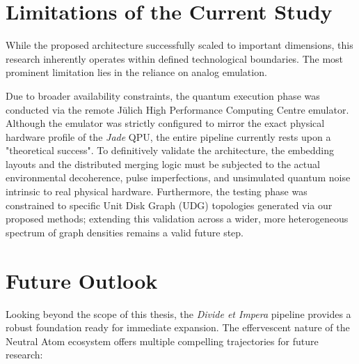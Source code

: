 \section{Limitations of the Current Study}
\label{sec:limitations}

While the proposed architecture successfully scaled to important dimensions, this research inherently operates within defined technological boundaries. The most prominent limitation lies in the reliance on analog emulation. 

Due to broader availability constraints, the quantum execution phase was conducted via the remote Jülich High Performance Computing Centre emulator. Although the emulator was strictly configured to mirror the exact physical hardware profile of the \textit{Jade} QPU, the entire pipeline currently rests upon a "theoretical success". To definitively validate the architecture, the embedding layouts and the distributed merging logic must be subjected to the actual environmental decoherence, pulse imperfections, and unsimulated quantum noise intrinsic to real physical hardware. Furthermore, the testing phase was constrained to specific Unit Disk Graph (UDG) topologies generated via our proposed methods; extending this validation across a wider, more heterogeneous spectrum of graph densities remains a valid future step.

\section{Future Outlook}
\label{sec:outlook}

Looking beyond the scope of this thesis, the \textit{Divide et Impera} pipeline provides a robust foundation ready for immediate expansion. The effervescent nature of the Neutral Atom ecosystem offers multiple compelling trajectories for future research:

